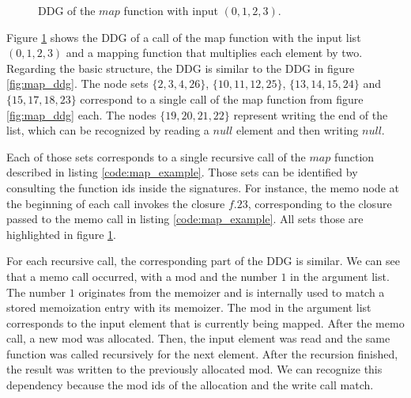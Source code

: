 \begin{figure}
\caption{DDG of the $map$ function with input $(0, 1, 2, 3)$.}
\label{fig:map_tbd_ddg}
\end{figure}


Figure \ref{fig:map_tbd_ddg} shows the DDG of a call of the map function with the input list $(0, 1, 2, 3)$ and a mapping function that multiplies each element by two. Regarding the basic structure, the DDG is similar to the DDG in figure \ref{fig:map_ddg}. The node sets $\{2, 3, 4, 26\}$, $\{10, 11, 12, 25\}$, $\{13, 14, 15, 24\}$ and $\{15, 17, 18, 23\}$ correspond to a single call of the map function from figure \ref{fig:map_ddg} each. The nodes $\{19, 20, 21, 22\}$ represent writing the end of the list, which can be recognized by reading a $null$ element and then writing $null$. 

Each of those sets corresponds to a single recursive call of the $map$ function described in listing \ref{code:map_example}. Those sets can be identified by consulting the function ids inside the signatures. For instance, the memo node at the beginning of each call invokes the closure $f.23$, corresponding to the closure passed to the memo call in listing \ref{code:map_example}. All sets those are highlighted in figure \ref{fig:map_tbd_ddg}.

For each recursive call, the corresponding part of the DDG is similar. We can see that a memo call occurred, with a mod and the number $1$ in the argument list. The number $1$ originates from the memoizer and is internally used to match a stored memoization entry with its memoizer. The mod in the argument list corresponds to the input element that is currently being mapped. After the memo call, a new mod was allocated. Then, the input element was read and the same function was called recursively for the next element. After the recursion finished, the result was written to the previously allocated mod. We can recognize this dependency because the mod ids of the allocation and the write call match. 

